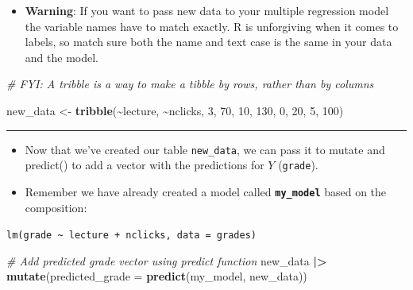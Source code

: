 \documentclass[
]{article}
\newenvironment{Shaded}{\begin{snugshade}}{\end{snugshade}}
\newcommand{\AttributeTok}[1]{\textcolor[rgb]{0.13,0.29,0.53}{#1}}
\newcommand{\CommentTok}[1]{\textcolor[rgb]{0.56,0.35,0.01}{\textit{#1}}}
\newcommand{\DecValTok}[1]{\textcolor[rgb]{0.00,0.00,0.81}{#1}}
\newcommand{\FunctionTok}[1]{\textcolor[rgb]{0.13,0.29,0.53}{\textbf{#1}}}
\newcommand{\NormalTok}[1]{#1}
\newcommand{\OtherTok}[1]{\textcolor[rgb]{0.56,0.35,0.01}{#1}}
\newcommand{\SpecialCharTok}[1]{\textcolor[rgb]{0.81,0.36,0.00}{\textbf{#1}}}
\providecommand{\tightlist}{%
  \setlength{\itemsep}{0pt}\setlength{\parskip}{0pt}}
\begin{document}
\begin{itemize}
\tightlist
\item
  \textbf{Warning}: If you want to pass new data to your multiple
  regression model the variable names have to match exactly. R is
  unforgiving when it comes to labels, so match sure both the name and
  text case is the same in your data and the model.
\end{itemize}

\begin{Shaded}
\begin{Highlighting}[]
\CommentTok{\# FYI: A \textquotesingle{}tribble\textquotesingle{} is a way to make a tibble by rows, rather than by columns}

\NormalTok{new\_data }\OtherTok{\textless{}{-}} 
  \FunctionTok{tribble}\NormalTok{(}\SpecialCharTok{\textasciitilde{}}\NormalTok{lecture, }\SpecialCharTok{\textasciitilde{}}\NormalTok{nclicks,}
          \DecValTok{3}\NormalTok{, }\DecValTok{70}\NormalTok{,}
          \DecValTok{10}\NormalTok{, }\DecValTok{130}\NormalTok{,}
          \DecValTok{0}\NormalTok{, }\DecValTok{20}\NormalTok{,}
          \DecValTok{5}\NormalTok{, }\DecValTok{100}\NormalTok{)}
\end{Highlighting}
\end{Shaded}

\begin{center}\rule{0.5\linewidth}{0.5pt}\end{center}

\begin{itemize}
\tightlist
\item
  Now that we've created our table \texttt{new\_data}, we can pass it to
  mutate and predict() to add a vector with the predictions for \(Y\)
  (\texttt{grade}).
\item
  Remember we have already created a model called
  \textbf{\texttt{my\_model}} based on the composition:
\end{itemize}

\texttt{lm(grade\ \textasciitilde{}\ lecture\ +\ nclicks,\ data\ =\ grades)}

\begin{Shaded}
\begin{Highlighting}[]
\CommentTok{\# Add predicted grade vector using \textasciigrave{}predict\textasciigrave{} function}
\NormalTok{new\_data }\SpecialCharTok{|\textgreater{}}
  \FunctionTok{mutate}\NormalTok{(}\AttributeTok{predicted\_grade =} \FunctionTok{predict}\NormalTok{(my\_model, new\_data))}
\end{Highlighting}
\end{Shaded}
\end{document}
